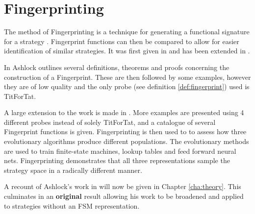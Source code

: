 \section{Fingerprinting}\label{sec:fingerprinting}

The method of Fingerprinting is a technique for generating a functional signature for a strategy \cite{Ashlock2008}.
Fingerprint functions can then be compared to allow for easier identification of similar strategies.
It was first given in \cite{Ashlock2004} and has been extended in \cite{Ashlock2008, Ashlock2010,  Ashlock2005, Ashlock2009, Ashlock2006}.

In \cite{Ashlock2004} Ashlock outlines several definitions, theorems and proofs concerning the construction of a Fingerprint.
These are then followed by some examples, however they are of low quality and the only probe (see definition \ref{def:fingerprint}) used is TitForTat.

A large extension to the work is made in \cite{Ashlock2008}.
More examples are presented using 4 different probes instead of solely TitForTat, and a catalogue of several Fingerprint functions is given.
Fingerprinting is then used to to assess how three evolutionary algorithms produce different populations.
The evolutionary methods are used to train finite-state machines, lookup tables and feed forward neural nets.
Fingerprinting demonstrates that all three representations sample the strategy space in a radically different manner.

A recount of Ashlock's work in \cite{Ashlock2008, Ashlock2010, Ashlock2004,  Ashlock2005, Ashlock2009, Ashlock2006} will now be given in Chapter \ref{cha:theory}.
This culminates in an \textbf{original} result allowing his work to be broadened and applied to strategies without an FSM representation.
